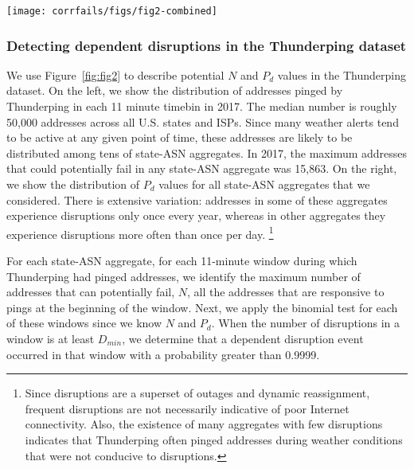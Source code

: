 \begin{figure*}[t]
\centering
\texttt{[image: corrfails/figs/fig2-combined]}
\caption{
\label{fig:fig2}
Potential $N$ and $P_d$ values in the Thunderping dataset: On
the left, we show the distribution of all addresses (across all
state-ASN aggregates) pinged by Thunderping that can potentially fail in each 11 minute
time bin. On the right, we show the distribution of the probability of disruption ($P_d$) for various state-ASN address aggregates.}
\end{figure*}

\subsubsection*{Detecting dependent disruptions in the Thunderping dataset}

\label{sec:tping-detection}

We use Figure~\ref{fig:fig2} to describe potential $N$ and $P_d$
values in the Thunderping dataset. On the left, we show the distribution
of addresses pinged by Thunderping in each 11 minute timebin in 2017. The
median number is roughly 50,000 addresses across all U.S. states and
ISPs. Since many weather alerts tend to be active at any given point of time,
these addresses are likely to be distributed among tens of state-ASN
aggregates. In 2017, the maximum addresses that could potentially fail in
any state-ASN aggregate was 15,863. On the right, we show the
distribution of $P_d$ values for all state-ASN aggregates that we
considered. There is extensive 
variation: addresses in some of these aggregates experience
disruptions only once every
year, whereas in other aggregates they experience disruptions more often than once per
day. \footnote{Since disruptions are a superset of outages and dynamic
  reassignment, frequent disruptions are not necessarily indicative of
  poor Internet connectivity. Also, the existence of many aggregates with few
  disruptions indicates that Thunderping often pinged addresses during weather
  conditions that were not conducive to disruptions.} 

For each state-ASN aggregate, for each 11-minute window
during which Thunderping had pinged addresses, we identify the maximum
number of addresses that can potentially fail, $N$, \ie all the
addresses that are responsive to pings at the beginning of the
window. Next, we apply the binomial test for each of these windows
since we know $N$ and $P_d$. When the number of disruptions in a window
is at least $D_{min}$, we determine that a dependent disruption event
occurred in that window with a probability greater than 0.9999. 

